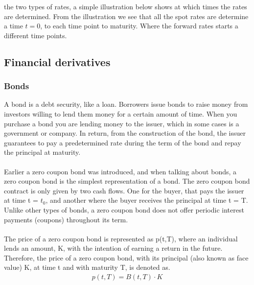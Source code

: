 the two types of rates, a simple illustration below shows at which times the rates are determined. From the illustration
we see that all the spot rates are determine a time $t=0$, to each time point to maturity. Where the forward rates starts
a different time points. 
\begin{center}
\end{center}
\subsection{Financial derivatives}
\subsubsection{Bonds}
A bond is a debt security, like a loan. Borrowers issue bonds to raise money 
from investors willing to lend them money for a certain amount of time.
When you purchase a bond you are lending money to the issuer, which in 
some cases is a government or company. In return, from the construction of the 
bond, the issuer guarantees to pay a predetermined rate during the term of the bond
and repay the principal at maturity. 
\\\\
Earlier a zero coupon bond was introduced, and when talking about bonds, a zero coupon 
bond is the simplest representation of a bond. The zero coupon bond contract is 
only given by two cash flows. One for the buyer, that pays the issuer at time 
t = $t_0$, and another where the buyer receives the principal at time t = T.
Unlike other types of bonds, a zero coupon bond does not offer periodic 
interest payments (coupons) throughout its term. \cite{Bjork} 
\\\\
The price of a zero coupon bond is represented as 
p(t,T), where an individual lends an amount, K, with the intention of earning a
return in the future. Therefore, the price of a zero coupon bond, with 
its principal (also known as face value) K, at time t and with maturity 
T, is denoted as.
\begin{align*}
    p(t,T)= B(t,T)\cdot K
\end{align*}
